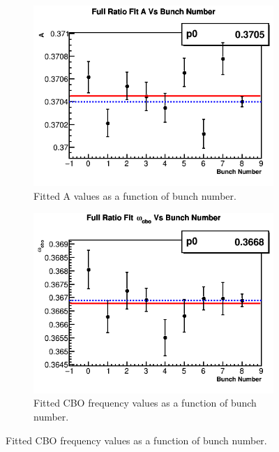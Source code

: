\begin{figure}[]
			\vspace{4mm}
		    \begin{subfigure}[t]{0.4\textwidth}
			    \centering
				\includegraphics[width=\textwidth]{RatioCBO_A_Vs_BunchNum_Canv}
			    \caption{Fitted A values as a function of bunch number.}
		    \end{subfigure}
		    \hspace{4mm}
		    \begin{subfigure}[t]{0.4\textwidth}
			    \centering
				\includegraphics[width=\textwidth]{RatioCBO_omega_cbo_Vs_BunchNum_Canv}
			    \caption{Fitted CBO frequency values as a function of bunch number.}
		    \end{subfigure}%

\end{figure}
